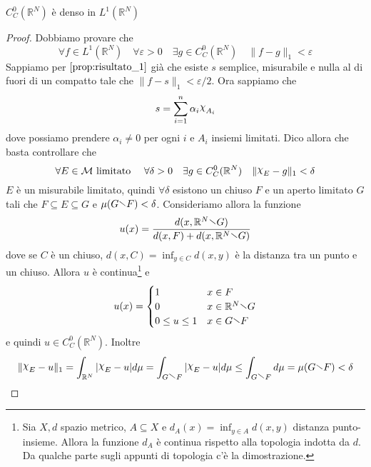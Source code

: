 \begin{proposition}\label{prop:risultato_2}
    \(C_C^{0}{(\mathbb{R}^{N})}\) è denso in \(L^1(\mathbb{R}^{N})\)
\end{proposition}
\begin{proof}
    Dobbiamo provare che 
    \[
        \forall f \in L^1(\mathbb{R}^{N}) \quad \forall \varepsilon > 0 \quad \exists g \in C_C^{0}{(\mathbb{R}^{N})} \quad \|f - g\|_1 < \varepsilon
    \]
    Sappiamo per \(\ref{prop:risultato_1}\) già che esiste \(s\) semplice, misurabile e nulla al di fuori di un
    compatto tale che \(\|f - s\|_1 < \varepsilon/2\). Ora sappiamo che
    \[
        s = \sum_{i=1}^{n} \alpha_i \rchi_{A_i}
    \]
    dove possiamo prendere \(\alpha_{i} \neq 0\) per ogni \(i\) e \(A_{i}\)
    insiemi limitati. Dico allora che basta controllare che 
    \[
        \forall E \in \mathcal{M} \text{ limitato } \quad \forall \delta > 0
        \quad \exists g \in C_C^{0}{(\mathbb{R}^{N})} \quad \|\rchi_E - g\|_1 < \delta
    \]
    \(E\)  è un misurabile limitato, quindi \(\forall \delta\) esistono un
    chiuso \(F\) e un aperto limitato \(G\) tali che \(F \subseteq E \subseteq G \) e
    \(\mu {( G \sminus F )} < \delta\). Consideriamo allora la funzione 
    \[
        u{(x)} = \frac{d{(x, \mathbb{R}^{N} \sminus G)}}{d{(x, F)} + d{(x, \mathbb{R}^{N} \sminus G)}}
    \]
    dove se \(C\) è un chiuso, \(d{(x, C)} = \inf_{y \in C} d{(x, y)}\) è la
    distanza tra un punto e un chiuso. Allora \(u\) è continua\footnote{
        Sia \(X, d\) spazio metrico, \(A \subseteq X \) e \(d_A{(x)} = \inf_{y
        \in A} d(x, y)\) distanza punto-insieme. Allora la funzione \(d_A\) è
        continua rispetto alla topologia indotta da \(d\). Da qualche parte
        sugli appunti di topologia c'è la dimostrazione.
    } e
    \[
        u{(x)} = \begin{cases}
            1 & x \in F  \\
            0 & x \in \mathbb{R}^{N} \sminus G \\
            0 \le u \le 1 & x \in G \sminus F
        \end{cases}
    \]
    e quindi \(u \in C_C^{0}{(\mathbb{R}^{N})}\). Inoltre
    \[
        \|\rchi_E - u\|_1 = \int_{\mathbb{R}^{N}} |\rchi_E - u| d\mu = \int_{G
        \sminus F} |\rchi_E - u| d\mu \le \int_{G \sminus F} d\mu =\mu{(G \sminus F)}< \delta 
    \]
\end{proof}

